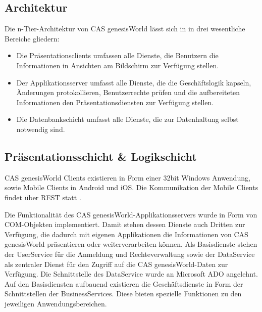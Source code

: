 \subsection{Architektur}

Die n-Tier-Architektur von CAS genesisWorld lässt sich in in drei wesentliche Bereiche gliedern:

\begin{itemize}
	\item Die Präsentationsclients umfassen alle Dienste, die Benutzern die Informationen in Ansichten am Bildschirm zur Verfügung stellen.
	\item Der Applikationsserver umfasst alle Dienste, die die Geschäftslogik kapseln, Änderungen protokollieren, Benutzerrechte prüfen und die aufbereiteten Informationen den Präsentationsdiensten zur Verfügung stellen.
	\item Die Datenbankschicht umfasst alle Dienste, die zur Datenhaltung selbst notwendig sind.
\end{itemize}


\subsection{Präsentationsschicht \& Logikschicht}

CAS genesisWorld Clients existieren in Form einer 32bit Windows Anwendung, sowie Mobile Clients in Android und iOS. Die Kommunikation der Mobile Clients findet über REST statt \cite{cas2013a}.

Die Funktionalität des CAS genesisWorld-Applikationsservers wurde in Form von COM-Objekten implementiert. Damit stehen dessen Dienste auch Dritten zur Verfügung, die dadurch mit eigenen Applikationen die Informationen von CAS genesisWorld präsentieren oder weiterverarbeiten können. Als Basisdienste stehen der UserService für die Anmeldung und Rechteverwaltung sowie der DataService als zentraler Dienst für den Zugriff auf die CAS genesisWorld-Daten zur Verfügung. Die Schnittstelle des DataService wurde an Microsoft ADO angelehnt. Auf den Basisdiensten aufbauend existieren die Geschäftsdienste in Form der Schnittstellen der BusinessServices. Diese bieten spezielle Funktionen zu den jeweiligen Anwendungsbereichen.

